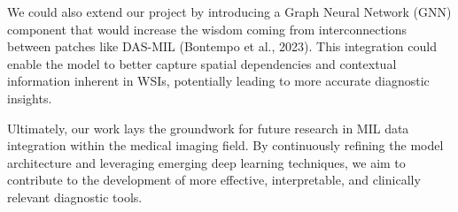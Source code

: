 \documentclass[10pt,twocolumn]{article}
\begin{document}
We could also extend our project by introducing a Graph Neural Network (GNN) component that would increase the wisdom coming from interconnections between patches like DAS-MIL (Bontempo et al., 2023)\cite{10.1007/978-3-031-43907-0_24}. This integration could enable the model to better capture spatial dependencies and contextual information inherent in WSIs, potentially leading to more accurate diagnostic insights. 

Ultimately, our work lays the groundwork for future research in MIL data integration within the medical imaging field. By continuously refining the model architecture and leveraging emerging deep learning techniques, we aim to contribute to the development of more effective, interpretable, and clinically relevant diagnostic tools.




\end{document}
